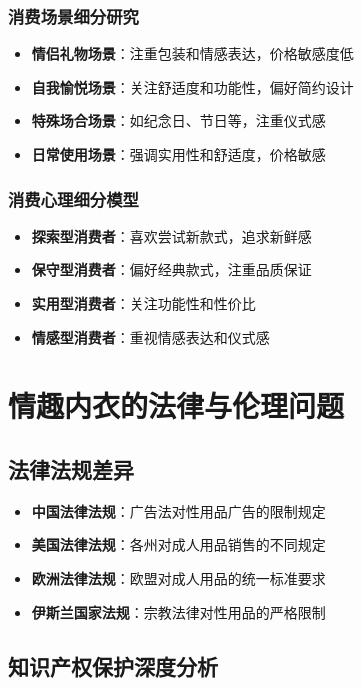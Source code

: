\documentclass[12pt,UTF8]{ctexbook}
\begin{document}
\subsubsection{消费场景细分研究}
\begin{itemize}[leftmargin=2cm]
	\item \textbf{情侣礼物场景}：注重包装和情感表达，价格敏感度低
	\item \textbf{自我愉悦场景}：关注舒适度和功能性，偏好简约设计
	\item \textbf{特殊场合场景}：如纪念日、节日等，注重仪式感
	\item \textbf{日常使用场景}：强调实用性和舒适度，价格敏感
\end{itemize}

\subsubsection{消费心理细分模型}
\begin{itemize}[leftmargin=2cm]
	\item \textbf{探索型消费者}：喜欢尝试新款式，追求新鲜感
	\item \textbf{保守型消费者}：偏好经典款式，注重品质保证
	\item \textbf{实用型消费者}：关注功能性和性价比
	\item \textbf{情感型消费者}：重视情感表达和仪式感
\end{itemize}

\section{情趣内衣的法律与伦理问题}
\subsection{法律法规差异}
\begin{itemize}[leftmargin=2cm]
	\item \textbf{中国法律法规}：广告法对性用品广告的限制规定
	\item \textbf{美国法律法规}：各州对成人用品销售的不同规定
	\item \textbf{欧洲法律法规}：欧盟对成人用品的统一标准要求
	\item \textbf{伊斯兰国家法规}：宗教法律对性用品的严格限制
\end{itemize}

\subsection{知识产权保护深度分析}
\end{document}

